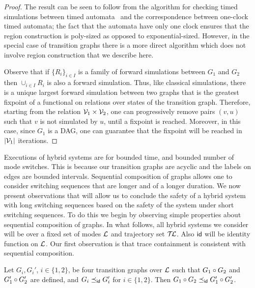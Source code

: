 \begin{proof}
The result can be seen to follow from the algorithm for checking timed
simulations between timed automata~\cite{cerans} and the
correspondence between one-clock timed automata; the fact that the
automata have only one clock ensures that the region construction is
poly-sized as opposed to exponential-sized. However, in the special
case of transition graphs there is a more direct algorithm which does
not involve region construction that we describe here.

Observe that if $\{R_i\}_{i\in I}$ is a family of forward simulations
between $G_1$ and $G_2$ then $\cup_{i \in I} R_i$ is also a forward
simulation. Thus, like classical simulations, there is a unique
largest forward simulation between two graphs that is the greatest
fixpoint of a functional on relations over states of the transition
graph. Therefore, starting from the relation ${\mathcal V}_1 \times {\mathcal V}_2$, one
can progressively remove pairs $(v,u)$ such that $v$ is not simulated
by $u$, until a fixpoint is reached. Moreover, in this case, since
$G_1$ is a DAG, one can guarantee that the fixpoint will be reached in
$|{\mathcal V}_1|$ iterations.
\end{proof}

Executions of hybrid systems are for bounded time, and bounded number
of mode switches. This is because our transition graphs are acyclic
and the labels on edges are bounded intervals. Sequential composition
of graphs allows one to consider switching sequences that are longer
and of a longer duration. We now present observations that will allow
us to conclude the safety of a hybrid system with long switching
sequences based on the safety of the system under short switching
sequences. To do this we begin by observing simple properties about
sequential composition of graphs. In what follows, all hybrid systems
we consider will be over a fixed set of modes ${\mathcal L}$ and trajectory set
$\mathcal{T\mkern-3mu L}$. Also ${\sf id}$ will be identity function on ${\mathcal L}$.
Our first observation is that trace containment is consistent with
sequential composition.
\begin{proposition}
\label{prop:cong-seqcomp}
Let $G_i, G_i'$, $i \in \{1,2\}$, be four transition graphs over ${\mathcal L}$
such that $G_1\circ G_2$ and $G_1'\circ G_2'$ are defined, and
$G_i \preceq_{{\sf id}} G_i'$ for $i \in \{1,2\}$. Then $G_1\circ
G_2 \preceq_{{\sf id}} G_1'\circ G_2'$.
\end{proposition}

